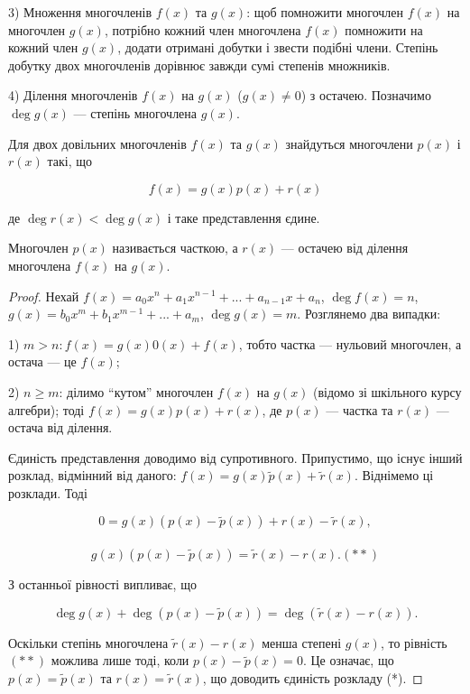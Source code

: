 3) Множення многочленів $f(x)$ та $g(x)$: щоб помножити многочлен $f(x)$ на
многочлен $g(x)$, потрібно кожний член многочлена $f(x)$ помножити на кожний
член $g(x)$, додати отримані добутки і звести подібні члени. Степінь добутку двох
многочленів дорівнює завжди сумі степенів множників.

4) Ділення многочленів $f(x)$ на $g(x)$ ($g(x) \neq 0$) з остачею. Позначимо
$\deg g(x)$ --- степінь многочлена $g(x)$.

\begin{theorem}
	Для двох довільних многочленів $f(x)$ та $g(x)$ знайдуться
	многочлени $p(x)$ і $r(x)$ такі, що
	
	$$f(x) = g(x)p(x) + r(x)$$

	де $\deg r(x) < \deg g(x)$ і таке представлення єдине.
	
	Многочлен $p(x)$ називається часткою, а $r(x)$ --- остачею від ділення
	многочлена $f(x)$ на $g(x)$.
\end{theorem}
\begin{proof}
	Нехай $f(x) = a_0x^n + a_1x^{n-1} + ... + a_{n-1}x + a_n$, $\deg f(x) = n$,
	$g(x) = b_0x^m + b_1x^{m-1} + ... + a_m$, $\deg g(x) = m$. Розглянемо два випадки:
	
	1) $m > n: f(x) = g(x) 0(x) + f(x)$, тобто частка --- нульовий многочлен, а остача
	--- це $f(x)$; 
	
	2) $n \geqslant m$: ділимо “кутом” многочлен $f(x)$ на $g(x)$ (відомо зі шкільного курсу
	алгебри); тоді $f(x) = g(x)p(x) + r(x)$, де $p(x)$ --- частка та $r(x)$ --- остача від
	ділення.
	
	Єдиність представлення доводимо від супротивного. Припустимо, що існує інший
	розклад, відмінний від даного: $f(x) = g(x)\tilde{p}(x) + \tilde{r}(x)$. Віднімемо ці розклади. Тоді

	$$0 = g(x)(p(x) -\tilde{p}(x)) + r(x) - \tilde{r}(x),$$\\
		
	$$g(x)(p(x) -\tilde{p}(x)) = \tilde{r}(x) - r(x). (**)$$
	
	З останньої рівності випливає, що
	
	$$\deg g(x) + \deg(p(x) -\tilde{p}(x)) = \deg(\tilde{r}(x) - r(x)).$$

	Оскільки степінь многочлена $\tilde{r}(x) - r(x)$ менша степені $g(x)$, то рівність $(**)$
	можлива лише тоді, коли $p(x) -\tilde{p}(x) = 0$. Це означає, що $p(x) = \tilde{p}(x)$ та $r(x) = \tilde{r}(x)$,
	що доводить єдиність розкладу (*).
\end{proof}

